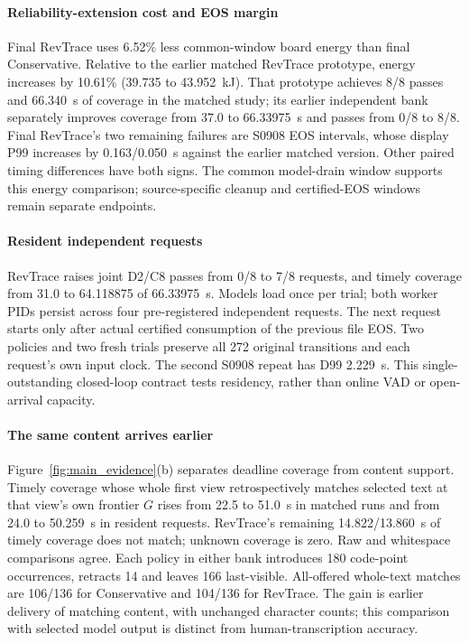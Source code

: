 \paragraph{Reliability-extension cost and EOS margin}
Final RevTrace uses 6.52\% less common-window board energy than final
Conservative. Relative to the earlier matched RevTrace prototype, energy
increases by 10.61\% (39.735 to 43.952~kJ). That prototype achieves 8/8
passes and 66.340~s of coverage in the matched study; its earlier
independent bank separately improves coverage from 37.0 to 66.33975~s
and passes from 0/8 to 8/8.
Final RevTrace's two remaining failures are S0908 EOS intervals, whose
display P99 increases by 0.163/0.050~s against the earlier matched version.
Other paired timing differences have both signs. The common model-drain
window supports this energy comparison; source-specific cleanup and
certified-EOS windows remain separate endpoints.

\paragraph{Resident independent requests}
RevTrace raises joint D2/C8 passes from 0/8 to 7/8 requests, and timely
coverage from 31.0 to 64.118875 of 66.33975~s. Models load once per trial;
both worker PIDs persist across four pre-registered independent requests.
The next request starts only after actual certified consumption of the
previous file EOS. Two policies and two fresh trials preserve all 272
original transitions and each request's own input clock. The second
S0908 repeat has D99 2.229~s. This single-outstanding closed-loop contract
tests residency, rather than online VAD or open-arrival capacity.

\paragraph{The same content arrives earlier}
Figure~\ref{fig:main_evidence}(b) separates deadline coverage from content
support. Timely coverage whose whole first view retrospectively matches selected
text at that view's own frontier $G$ rises from 22.5 to 51.0~s in matched
runs and from 24.0 to 50.259~s in resident requests. RevTrace's remaining
14.822/13.860~s of timely coverage does not match; unknown coverage is zero.
Raw and whitespace comparisons agree. Each policy in either bank
introduces 180 code-point occurrences, retracts 14 and leaves 166
last-visible. All-offered whole-text matches are 106/136 for Conservative
and 104/136 for RevTrace. The gain is earlier delivery of matching content,
with unchanged character counts; this comparison with selected model
output is distinct from human-transcription accuracy.

